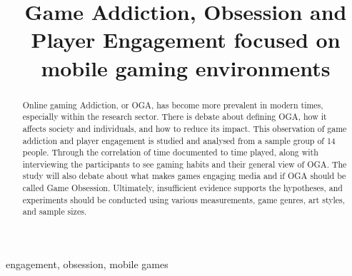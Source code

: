 \documentclass[conference]{IEEEtran}
\begin{document}


\lstset{style=style}

\title{Game Addiction, Obsession and Player Engagement focused on mobile gaming environments \\
}

\author{
}

\maketitle



\begin{abstract}
Online gaming Addiction, or OGA, has become more prevalent in modern times, especially within the research sector. There is debate about defining OGA, how it affects society and individuals, and how to reduce its impact. This observation of game addiction and player engagement is studied and analysed from a sample group of 14 people. Through the correlation of time documented to time played, along with interviewing the participants to see gaming habits and their general view of OGA. The study will also debate about what makes games engaging media and if OGA should be called Game Obsession. Ultimately, insufficient evidence supports the hypotheses, and experiments should be conducted using various measurements, game genres, art styles, and sample sizes.
\end{abstract}
\begin{IEEEkeywords}
engagement, obsession, mobile games
\end{IEEEkeywords}
\end{document}
